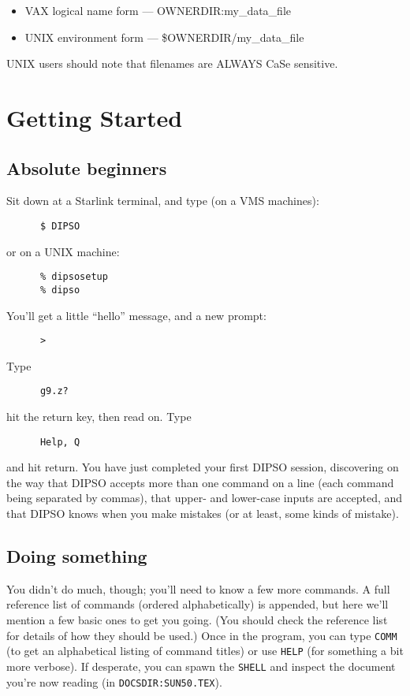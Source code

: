 \begin{itemize}
\item{VAX logical name form --- OWNERDIR:my\_data\_file}
\item{UNIX environment form --- \$OWNERDIR/my\_data\_file}
\end{itemize}

UNIX users should note that filenames are ALWAYS CaSe sensitive.

\section {Getting Started}

\subsection {Absolute beginners}
Sit down at a Starlink terminal, and type (on a VMS machines):
\begin{verbatim}
      $ DIPSO
\end{verbatim}
or on a UNIX machine:
\begin{verbatim}
      % dipsosetup
      % dipso
\end{verbatim}
You'll get a little ``hello'' message, and a new prompt:
\begin{verbatim}
      >
\end{verbatim}
Type
\begin{verbatim}
      g9.z?
\end{verbatim}
hit the return key, then read on. Type
\begin{verbatim}
      Help, Q
\end{verbatim}

and hit return. You have just completed your first DIPSO session,
discovering on the way that DIPSO accepts more than one command on a
line (each command being separated by commas), that upper- and
lower-case inputs are accepted, and that DIPSO knows when you make
mistakes (or at least, some kinds of mistake).

\subsection {Doing something}

You didn't do much, though;  you'll need to know a few more commands.
A full reference list of commands (ordered alphabetically) is
appended, but here we'll mention a few basic ones to get you going.
(You should check the reference list for details of how they should be
used.) Once in the program, you can type {\tt COMM} (to get an alphabetical
listing of command titles) or use {\tt HELP} (for something a bit more
verbose). If desperate, you can spawn the {\tt SHELL} and inspect the
document you're now reading (in {\tt DOCSDIR:SUN50.TEX}).

